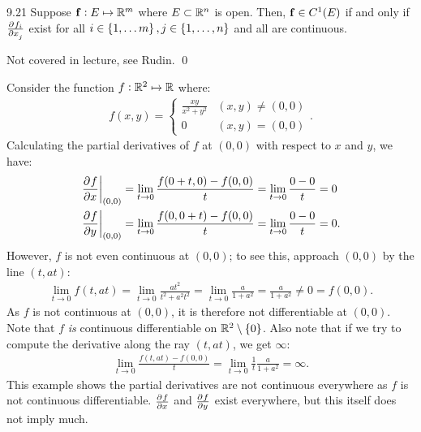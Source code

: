 \begin{theorem}{}{9.21}
    Suppose $\mathbf{f}: E \mapsto \mathbb{R}^m$ where $E \subset \mathbb{R}^n$ is open. Then, $\mathbf{f} \in C^1(E)$ if and only if $\pd{f_i}{x_j}$ exist for all $i \in \set{1, \ldots m}, j \in \set{1, \ldots, n}$ and all are continuous.
\end{theorem}
\begin{nproof}
    Not covered in lecture, see Rudin. \qed
\end{nproof}

\begin{nexample}{}{}
    Consider the function $f: \mathbb{R}^2 \mapsto \mathbb{R}$ where:
    \begin{align*}
        f(x, y) = \begin{cases}
            \frac{xy}{x^2 + y^2} & (x, y) \neq (0, 0)
            \\ 0 & (x, y) = (0, 0)
        \end{cases}.
    \end{align*}
    Calculating the partial derivatives of $f$ at $(0, 0)$ with respect to $x$ and $y$, we have:
    \begin{align*}
        \left.\dpd{f}{x}\right|_{(0, 0)} &= \lim_{t \rightarrow 0}\frac{f(0 + t, 0) - f(0, 0)}{t} = \lim_{t \rightarrow 0} \frac{0 - 0}{t} = 0
        \\ \left.\dpd{f}{y}\right|_{(0, 0)} &= \lim_{t \rightarrow 0}\frac{f(0, 0 + t) - f(0, 0)}{t} = \lim_{t \rightarrow 0} \frac{0 - 0}{t} = 0.
    \end{align*}
    However, $f$ is not even continuous at $(0, 0)$; to see this, approach $(0, 0)$ by the line $(t, at)$:
    \begin{align*}
        \lim_{t \rightarrow 0}f(t, at) = \lim_{t \rightarrow 0}\frac{at^2}{t^2 + a^2t^2} = \lim_{t \rightarrow 0}\frac{a}{1+a^2} = \frac{a}{1+a^2} \neq 0 = f(0, 0).
    \end{align*}
    As $f$ is not continuous at $(0, 0)$, it is therefore not differentiable at $(0, 0)$. Note that $f$ \emph{is} continuous differentiable on $\mathbb{R}^2 \setminus \set{0}$. Also note that if we try to compute the derivative along the ray $(t, at)$, we get $\infty$:
    \begin{align*}
        \lim_{t \rightarrow 0} \frac{f(t, at) - f(0, 0)}{t} = \lim_{t \rightarrow 0}\frac{1}{t}\frac{a}{1+a^2} = \infty.
    \end{align*}
    This example shows the partial derivatives are not continuous everywhere as $f$ is not continuous differentiable. $\pd{f}{x}$ and $\pd{f}{y}$ exist everywhere, but this itself does not imply much.
\end{nexample}

